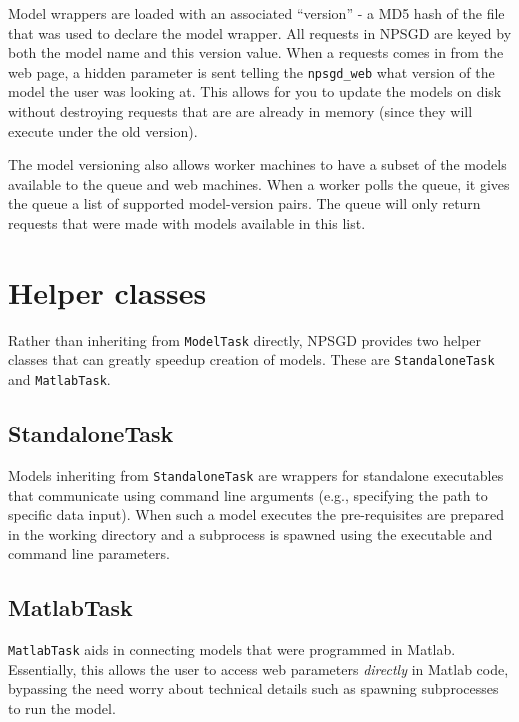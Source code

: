 \documentclass{article}
\newcommand{\mclass}[1]{\texttt{#1}}
\begin{document}
Model wrappers are loaded with an associated ``version'' - a MD5 hash of the
file that was used to declare the model wrapper. All requests in NPSGD are keyed
by both the model name and this version value. When a requests comes in from the
web page, a hidden parameter is sent telling the \texttt{npsgd\_web} what
version of the model the user was looking at. This allows for you to update the
models on disk without destroying requests that are are already in memory (since
they will execute under the old version).

The model versioning also allows worker machines to have a subset of the models
available to the queue and web machines. When a worker polls the queue, it gives
the queue a list of supported model-version pairs. The queue will only return
requests that were made with models available in this list.

\section{Helper classes}
\label{sec:helpers}
Rather than inheriting from \mclass{ModelTask} directly, NPSGD provides two
helper classes that can greatly speedup creation of models. These are
\mclass{StandaloneTask} and \mclass{MatlabTask}.

\subsection{StandaloneTask}
Models inheriting from \mclass{StandaloneTask} are wrappers for standalone executables
that communicate using command line arguments (e.g., specifying the path to
specific data input). When such a model executes the pre-requisites are prepared
in the working directory and a subprocess is spawned using the executable and
command line parameters. 

\subsection{MatlabTask}
\mclass{MatlabTask} aids in connecting models that were programmed in Matlab. Essentially, this
allows the user to access web parameters \textit{directly} in Matlab code,
bypassing the need worry about technical details such as spawning subprocesses
to run the model.
\end{document}
